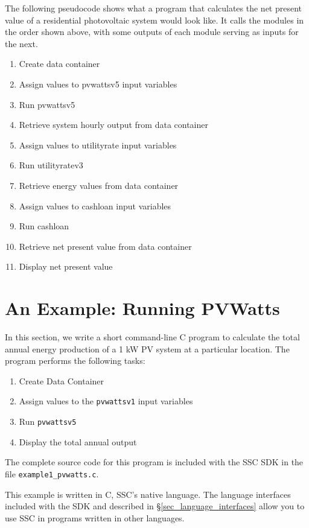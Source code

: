 \documentclass{scrartcl} %
\newcommand{\+}{\discretionary{\mbox{\scriptsize$\hookleftarrow$}}{}{}}
\begin{document}
The following pseudocode shows what a program that calculates the net present value of a residential photovoltaic system would look like. It calls the modules in the order shown above, with some outputs of each module serving as inputs for the next.

\begin{enumerate}
\item Create data container
\item Assign values to pvwattsv5 input variables
\item Run pvwattsv5
\item Retrieve system hourly output from data container
\item Assign values to utilityrate input variables
\item Run utilityratev3
\item Retrieve energy values from data container
\item Assign values to cashloan input variables
\item Run cashloan
\item Retrieve net present value from data container
\item Display net present value
\end{enumerate}

\section{An Example: Running PVWatts}
\label{sec_pvwatts_example}

In this section, we write a short command-line C program to calculate the total annual energy production of a 1 kW PV system at a particular location. The program performs the following tasks:

\begin{enumerate}
\item Create Data Container
\item Assign values to the \texttt{pvwattsv1} input variables
\item Run \texttt{pvwattsv5}
\item Display the total annual output
\end{enumerate}

The complete source code for this program is included with the SSC SDK in the file \texttt{example1\_pvwatts.c}.

This example is written in C, SSC's native language. The language interfaces included with the SDK and described in \S\ref{sec_language_interfaces} allow you to use SSC in programs written in other languages.
\end{document}
